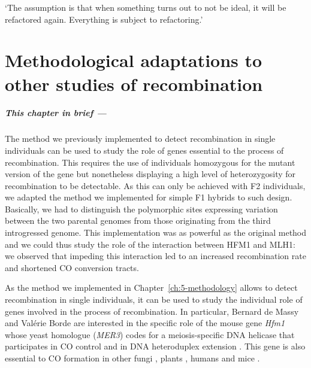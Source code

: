 \begin{savequote}[8cm]
	
	‘The assumption is that when something turns out to not be ideal, it will be refactored again. Everything is subject to refactoring.’
	
\end{savequote}

\chapter{\label{ch:8-HFM1}Methodological adaptations to other studies of recombination}



\minitoc{}

{\small{} \itshape{}

\paragraph{This chapter in brief —}

The method we previously implemented to detect recombination in single individuals can be used to study the role of genes essential to the process of recombination.
This requires the use of individuals homozygous for the mutant version of the gene but nonetheless displaying a high level of heterozygosity for recombination to be detectable.
As this can only be achieved with F2 individuals,
we adapted the method we implemented for simple F1 hybrids to such design.
Basically, we had to distinguish the polymorphic sites expressing variation between the two parental genomes from those originating from the third introgressed genome.
This implementation was as powerful as the original method and we could thus study the role of the interaction between HFM1 and MLH1:
we observed that impeding this interaction led to an increased recombination rate and shortened CO conversion tracts.

}

\newpage


As the method we implemented in Chapter~\ref{ch:5-methodology} allows to detect recombination in single individuals, it can be used to study the individual role of genes involved in the process of recombination.
In particular, Bernard de Massy and Valérie Borde are interested in the specific role of the mouse gene \textit{Hfm1} whose yeast homologue (\textit{MER3}) codes for a meiosis-specific DNA helicase \citep{nakagawa1999saccharomyces,nakagawa2002saccharomyces} that participates in CO control and in DNA heteroduplex extension \citep{mazina2004saccharomyces,nakagawa2002mer3}.
This gene is also essential to CO formation in other fungi \citep{sugawara2009coprinus}, plants \citep{mercier2005two,chen2005arabidopsis}, humans \citep{tanaka2006hfm1} and mice \citep{guiraldelli2013mouse}.


